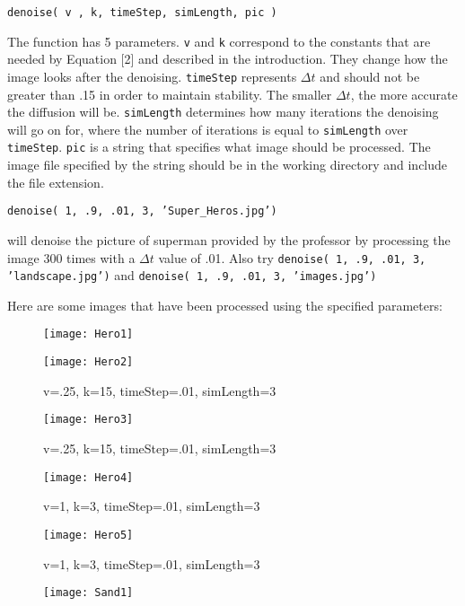 \documentclass[12pt]{article}
\begin{document}
\texttt{denoise( v , k, timeStep, simLength, pic )}

The function has 5 parameters. \texttt{v} and \texttt{k} correspond to the constants that are needed by Equation [2] and described in the introduction. They change how the image looks after the denoising. \texttt{timeStep} represents $\Delta t$ and should not be greater than .15 in order to maintain stability. The smaller $\Delta t$, the more accurate the diffusion will be. \texttt{simLength} determines how many iterations the denoising will go on for, where the number of iterations is equal to \texttt{simLength} over \texttt{timeStep}. \texttt{pic} is a string that specifies what image should be processed. The image file specified by the string should be in the working directory and include the file extension.

\texttt{denoise( 1, .9, .01, 3, 'Super\_Heros.jpg')}

will denoise the picture of superman provided by the professor by processing the image 300 times with a $\Delta t$ value of .01. Also try \texttt{denoise( 1, .9, .01, 3, 'landscape.jpg')} and \texttt{denoise( 1, .9, .01, 3, 'images.jpg')}

Here are some images that have been processed using the specified parameters:
\begin{figure}[H]
\centering
    \texttt{[image: Hero1]}

\end{figure}

\begin{figure}[H]
\centering
    \texttt{[image: Hero2]}
    \caption{v=.25, k=15, timeStep=.01, simLength=3}
\centering
    \texttt{[image: Hero3]}
    \caption{v=.25, k=15, timeStep=.01, simLength=3}
    
\end{figure}

\begin{figure}[H]
\centering
    \texttt{[image: Hero4]}
    \caption{v=1, k=3, timeStep=.01, simLength=3}
\centering
    \texttt{[image: Hero5]}
    \caption{v=1, k=3, timeStep=.01, simLength=3}

\end{figure}

\begin{figure}[H]
	\centering
    \texttt{[image: Sand1]}

\end{figure}
\end{document}
